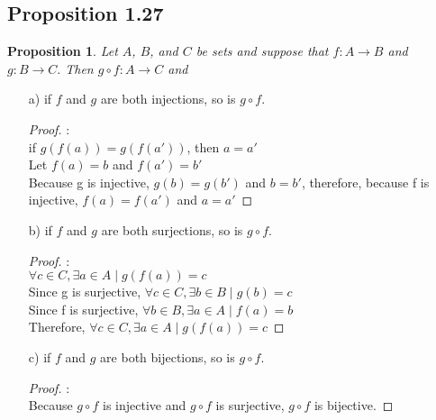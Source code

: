 \documentclass[openany, amssymb, psamsfonts]{amsart}
\newtheorem{prop}{Proposition}[section]
\theoremstyle{definition}
\numberwithin{equation}{section}
\begin{document}
\subsection{Proposition 1.27}
\label{Proposition 1.27}
\begin{prop}
Let $A$, $B$, and $C$ be sets and suppose that $f:A\longrightarrow B$  and  $g:B\longrightarrow C.$  Then $g\circ f:A\longrightarrow C$ and
\end{prop}
\begin{enumerate}
\item[a)] if $f$ and $g$ are both injections, so is $g\circ f.$\\
\begin{proof}:\\
if $g(f(a))=g(f(a'))$, then $a=a'$\\
Let $f(a)=b$ and $f(a')=b'$\\
Because g is injective, $g(b) = g(b')$ and $b=b'$, therefore, because f is injective, $f(a)=f(a')$ and $a=a'$ 
\end{proof}
\item[b)] if $f$ and $g$ are both surjections, so is $g\circ f.$\\
\begin{proof}:\\
$\forall c\in C, \exists a\in A \mid g(f(a)) = c$\\
Since g is surjective, $\forall c\in C, \exists b\in B \mid g(b) = c$\\
Since f is surjective, $\forall b\in B, \exists a\in A \mid f(a) = b$\\
Therefore, $\forall c\in C, \exists a\in A \mid g(f(a)) = c$
\end{proof}
\item[c)] if $f$ and $g$ are both bijections, so is $g\circ f.$
\begin{proof}:\\
Because $g\circ f$ is injective and $g\circ f$ is surjective, $g\circ f$ is bijective. 
\end{proof}
\end{enumerate}
\end{document}
